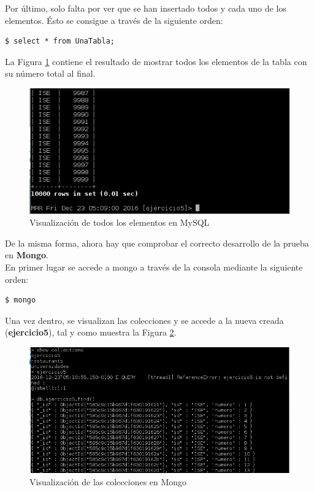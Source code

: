 Por último, solo falta por ver que se han insertado todos y cada uno de los elementos. Ésto se consigue a través de la siguiente orden:
\begin{lstlisting}[style=fich]
$ select * from UnaTabla;
\end{lstlisting}
\vspace{-22pt}

La Figura \ref{fig:figura5-4} contiene el resultado de mostrar todos los elementos de la tabla con su número total al final.
\begin{figure}[H] %
	\centering
	\includegraphics[scale=1]{figuras/ejercicio5/figura5-4.png} 
	\caption{Visualización de todos los elementos en MySQL} 
	\label{fig:figura5-4}
\end{figure}


De la misma forma, ahora hay que comprobar el correcto desarrollo de la prueba en \textbf{Mongo}.
\\

En primer lugar se accede a mongo a través de la consola mediante la siguiente orden:
\begin{lstlisting}[style=fich]
$ mongo
\end{lstlisting}
\vspace{-22pt}

Una vez dentro, se visualizan las colecciones y se accede a la nueva creada (\textbf{ejercicio5}), tal y como muestra la Figura \ref{fig:figura5-5}.
\begin{figure}[H] %
	\centering
	\includegraphics[scale=0.65]{figuras/ejercicio5/figura5-5.png} 
	\caption{Visualización de las colecciones en Mongo} 
	\label{fig:figura5-5}
\end{figure}

